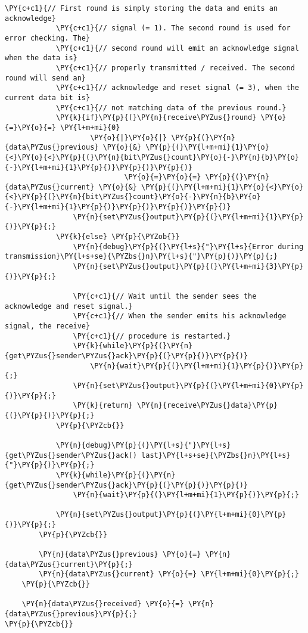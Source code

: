 \begin{Verbatim}[commandchars=\\\{\}]
            \PY{c+c1}{// First round is simply storing the data and emits an acknowledge}
            \PY{c+c1}{// signal (= 1). The second round is used for error checking. The}
            \PY{c+c1}{// second round will emit an acknowledge signal when the data is}
            \PY{c+c1}{// properly transmitted / received. The second round will send an}
            \PY{c+c1}{// acknowledge and reset signal (= 3), when the current data bit is}
            \PY{c+c1}{// not matching data of the previous round.}
            \PY{k}{if}\PY{p}{(}\PY{n}{receive\PYZus{}round} \PY{o}{=}\PY{o}{=} \PY{l+m+mi}{0}
                    \PY{o}{|}\PY{o}{|} \PY{p}{(}\PY{n}{data\PYZus{}previous} \PY{o}{&} \PY{p}{(}\PY{l+m+mi}{1}\PY{o}{<}\PY{o}{<}\PY{p}{(}\PY{n}{bit\PYZus{}count}\PY{o}{-}\PY{n}{b}\PY{o}{-}\PY{l+m+mi}{1}\PY{p}{)}\PY{p}{)}\PY{p}{)}
                            \PY{o}{=}\PY{o}{=} \PY{p}{(}\PY{n}{data\PYZus{}current} \PY{o}{&} \PY{p}{(}\PY{l+m+mi}{1}\PY{o}{<}\PY{o}{<}\PY{p}{(}\PY{n}{bit\PYZus{}count}\PY{o}{-}\PY{n}{b}\PY{o}{-}\PY{l+m+mi}{1}\PY{p}{)}\PY{p}{)}\PY{p}{)}\PY{p}{)}
                \PY{n}{set\PYZus{}output}\PY{p}{(}\PY{l+m+mi}{1}\PY{p}{)}\PY{p}{;}
            \PY{k}{else} \PY{p}{\PYZob{}}
                \PY{n}{debug}\PY{p}{(}\PY{l+s}{"}\PY{l+s}{Error during transmission}\PY{l+s+se}{\PYZbs{}n}\PY{l+s}{"}\PY{p}{)}\PY{p}{;}
                \PY{n}{set\PYZus{}output}\PY{p}{(}\PY{l+m+mi}{3}\PY{p}{)}\PY{p}{;}

                \PY{c+c1}{// Wait until the sender sees the acknowledge and reset signal.}
                \PY{c+c1}{// When the sender emits his acknowledge signal, the receive}
                \PY{c+c1}{// procedure is restarted.}
                \PY{k}{while}\PY{p}{(}\PY{n}{get\PYZus{}sender\PYZus{}ack}\PY{p}{(}\PY{p}{)}\PY{p}{)}
                    \PY{n}{wait}\PY{p}{(}\PY{l+m+mi}{1}\PY{p}{)}\PY{p}{;}
                \PY{n}{set\PYZus{}output}\PY{p}{(}\PY{l+m+mi}{0}\PY{p}{)}\PY{p}{;}
                \PY{k}{return} \PY{n}{receive\PYZus{}data}\PY{p}{(}\PY{p}{)}\PY{p}{;}
            \PY{p}{\PYZcb{}}

            \PY{n}{debug}\PY{p}{(}\PY{l+s}{"}\PY{l+s}{get\PYZus{}sender\PYZus{}ack() last}\PY{l+s+se}{\PYZbs{}n}\PY{l+s}{"}\PY{p}{)}\PY{p}{;}
            \PY{k}{while}\PY{p}{(}\PY{n}{get\PYZus{}sender\PYZus{}ack}\PY{p}{(}\PY{p}{)}\PY{p}{)}
                \PY{n}{wait}\PY{p}{(}\PY{l+m+mi}{1}\PY{p}{)}\PY{p}{;}

            \PY{n}{set\PYZus{}output}\PY{p}{(}\PY{l+m+mi}{0}\PY{p}{)}\PY{p}{;}
        \PY{p}{\PYZcb{}}

        \PY{n}{data\PYZus{}previous} \PY{o}{=} \PY{n}{data\PYZus{}current}\PY{p}{;}
        \PY{n}{data\PYZus{}current} \PY{o}{=} \PY{l+m+mi}{0}\PY{p}{;}
    \PY{p}{\PYZcb{}}

    \PY{n}{data\PYZus{}received} \PY{o}{=} \PY{n}{data\PYZus{}previous}\PY{p}{;}
\PY{p}{\PYZcb{}}
\end{Verbatim}
